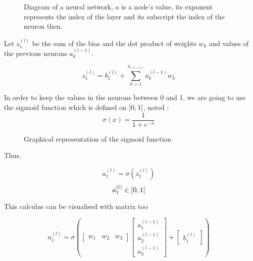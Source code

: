 \documentclass[]{report}
\begin{document}
\begin{figure}[H]
    \centering
    \begin{neuralnetwork}[height=4, nodespacing=15mm]
        \newcommand{\inputtext}[2]{$a^{(l-1)}_#2$}
        \newcommand{\outputtext}[2]{$a^{(l)}_#2$}
        \inputlayer[count=3, bias=false, text=\inputtext, title=Input layer]
        \outputlayer[count=1,  text=\outputtext, title=Output layer]
        \linklayers[title=Weights $w_k$]
    \end{neuralnetwork}
    \caption{Diagram of a neural network, $a$ is a node's value, its exponent represents the index of the layer and its subscript the index of the neuron then.}
\end{figure}

{Let $z^{(l)}_1$ be the sum of the bias and the dot product of weights $w_k$ and values of the previous neurons $a^{(l-1)}_k$.}

\[{z^{(l)}_1=b^{(l)}_1+\sum_{k=1}^{n_{(l-1)}} a^{(l-1)}_k w_k}\]

{In order to keep the values in the neurons between 0 and 1, we are going to use the sigmoid function which is defined on $\interval[open]{0}{1}$, noted :}
\[\sigma(x)=\frac{1}{1+e^{-x}}\]

\begin{figure}[H]
    \centering
    \caption{Graphical representation of the sigmoid function}
\end{figure}

{Thus,}

\[a^{(l)}_1=\sigma\left(z^{(l)}_1\right)\]
\[a^{(l)}_1 \in \interval[open]{0}{1}\]

{This calculus can be visualised with matrix too}

\[a^{(l)}_1=\sigma\left(\begin{bmatrix}w_1 & w_2 & w_3\end{bmatrix}\begin{bmatrix}a^{(l-1)}_1 \\ a^{(l-1)}_2 \\ a^{(l-1)}_3\end{bmatrix}+\begin{bmatrix}b^{(l)}_1\end{bmatrix}\right)\]
\end{document}
